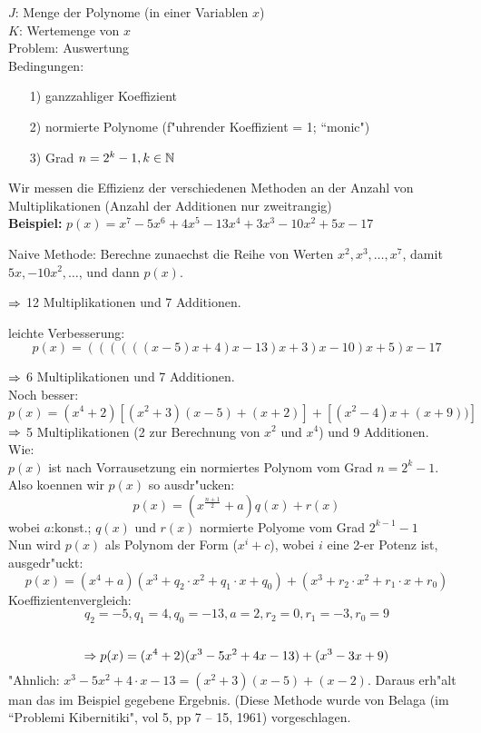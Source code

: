 \documentclass[a4paper]{scrartcl}
\begin{document}
$J$: Menge der Polynome (in einer Variablen $x$)\\
$K$: Wertemenge von $x$\\

Problem: Auswertung\\

Bedingungen: 
\begin{itemize}
\item[1)] ganzzahliger Koeffizient
\item[2)] normierte Polynome (f"uhrender Koeffizient = 1; ``monic")
\item[3)] Grad $n=2^k-1, k \in \mathbb{N}$
\end{itemize}

Wir messen die Effizienz der verschiedenen Methoden an der Anzahl von Multiplikationen (Anzahl der Additionen nur zweitrangig)\\

\textbf{Beispiel:} $p(x)=x^7-5x^6+4x^5-13x^4+3x^3-10x^2+5x-17$

Naive Methode: Berechne zunaechst die Reihe von Werten $x^2,x^3,\dots,x^7$, damit $5x,-10x^2,\dots$, und dann $p(x)$.

$\Rightarrow$ 12 Multiplikationen und 7 Additionen.

leichte Verbesserung: $$p(x)=((((((x-5)x+4)x-13)x+3)x-10)x+5)x-17$$	

$\Rightarrow$ 6 Multiplikationen und 7 Additionen.\\

Noch besser: 
$$p(x)=(x^4+2)[(x^2+3)(x-5)+(x+2)]+[(x^2-4)x+(x+9))]$$
$\Rightarrow$ 5 Multiplikationen (2 zur Berechnung von $x^2$ und $x^4$) und 9 Additionen.\\

Wie:\\
$p(x)$ ist nach Vorrausetzung ein normiertes Polynom vom Grad $n=2^k-1$. Also koennen wir $p(x)$ so ausdr"ucken:
	$$p(x)=(x^{\frac{n+1}{2}}+a)q(x)+r(x)$$
wobei $a$:konst.; $q(x)$ und $r(x)$ normierte Polyome vom Grad $2^{k-1}-1$\\
Nun wird $p(x)$ als Polynom der Form ($x^i+c$), wobei $i$ eine 2-er Potenz ist, ausgedr"uckt:
$$p(x)=(x^4+a)(x^3+q_2\cdot x^2+q_1\cdot x+q_0)+(x^3+r_2\cdot x^2+r_1\cdot x+r_0)$$
Koeffizientenvergleich:
$$q_2=-5, q_1=4,q_0=-13,a=2,r_2=0,r_1=-3,r_0=9$$\\
$$\Rightarrow p(x)=(x^4+2)(x^3-5x^2+4x-13)+(x^3-3x+9)$$
"Ahnlich: $x^3-5x^2+4\cdot x-13=(x^2+3)(x-5)+(x-2)$. Daraus erh"alt man das im Beispiel gegebene Ergebnis.
(Diese Methode wurde von Belaga (im ``Problemi Kibernitiki", vol 5, pp 7 -- 15, 1961) vorgeschlagen.
\end{document}
